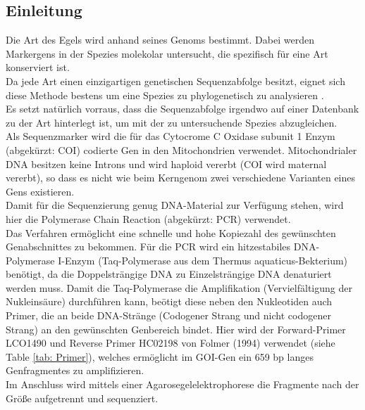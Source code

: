 \documentclass[oneside,10pt,a4paper]{report}
\begin{document}
			\subsection{Einleitung}
				Die Art des Egels wird anhand seines Genoms bestimmt. 
				Dabei werden Markergens in der Spezies molekolar untersucht, die spezifisch für eine Art konserviert ist.\\
				Da jede Art einen einzigartigen genetischen Sequenzabfolge besitzt, eignet sich diese Methode bestens um eine Spezies zu phylogenetisch zu analysieren \cite{Folmer} \cite{Herbert}.\\
				Es setzt natürlich vorraus, dass die Sequenzabfolge irgendwo auf einer Datenbank zu der Art hinterlegt ist, um mit der zu untersuchende Spezies abzugleichen.\\
				Als Sequenzmarker wird die für das  Cytocrome C Oxidase subunit 1 Enzym (abgekürzt: COI) codierte Gen in den Mitochondrien verwendet. Mitochondrialer DNA besitzen keine Introns und wird haploid vererbt (COI wird maternal vererbt), so dass es nicht wie beim Kerngenom zwei verschiedene Varianten eines Gens existieren.\\
				Damit für die Sequenzierung genug DNA-Material zur Verfügung stehen, wird hier die Polymerase Chain Reaction (abgekürzt: PCR) verwendet.\\
				Das Verfahren ermöglicht eine schnelle und hohe Kopiezahl des gewünschten Genabschnittes zu bekommen.
				Für die PCR wird ein hitzestabiles DNA-Polymerase I-Enzym (Taq-Polymerase aus dem Thermus aquaticus-Bekterium) benötigt, da die Doppelsträngige DNA zu Einzelsträngige DNA denaturiert werden muss.
				Damit die Taq-Polymerase die Amplifikation (Vervielfältigung der Nukleinsäure) durchführen kann, beötigt diese neben den Nukleotiden auch Primer, die an beide DNA-Stränge (Codogener Strang und nicht codogener Strang) an den gewünschten Genbereich bindet. Hier wird der Forward-Primer LCO1490 und Reverse Primer HC02198 von Folmer (1994) verwendet (siehe Table \ref{tab: Primer}), welches ermöglicht im GOI-Gen ein 659 bp langes Genfragmentes zu amplifizieren.\\
				Im Anschluss wird mittels einer Agarosegelelektrophorese die Fragmente nach der Größe aufgetrennt und sequenziert.\\
				
			
\end{document}
